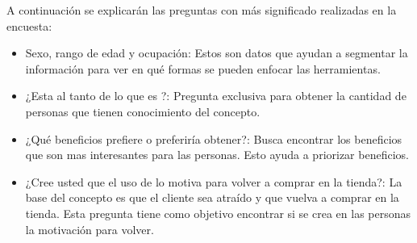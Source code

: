 A continuación se explicarán las preguntas con más significado realizadas en la encuesta:
\begin{itemize}
\item Sexo, rango de edad y ocupación: Estos son datos que ayudan a segmentar
la información para ver en qué formas se pueden enfocar las herramientas.
\item ¿Esta al tanto de lo que es {\gam}?: Pregunta exclusiva para obtener la cantidad de
personas que tienen conocimiento del concepto.
\item ¿Qué beneficios prefiere o preferiría obtener?: Busca encontrar los beneficios que son
 mas interesantes para las personas. Esto ayuda a priorizar beneficios.
\item ¿Cree usted que el uso de {\gam} lo motiva para volver a comprar en la tienda?: La
base del concepto es que el cliente sea atraído y que vuelva a comprar en la tienda. Esta pregunta
tiene como objetivo encontrar si se crea en las personas la motivación para volver.
\end{itemize}
